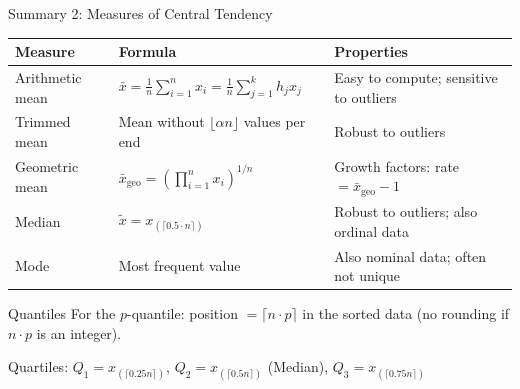 \documentclass[aspectratio=169,11pt]{beamer}
\begin{document}
\begin{frame}{Summary 2: Measures of Central Tendency}
  \begin{center}
    \small\renewcommand{\arraystretch}{1.2}
    \begin{tabular}{lll}
      \toprule
      \textbf{Measure} & \textbf{Formula} & \textbf{Properties} \\
      \midrule
      Arithmetic mean & $\bar{x} = \frac{1}{n}\sum_{i=1}^{n} x_i = \frac{1}{n}\sum_{j=1}^{k} h_j x_j$ & Easy to compute; sensitive to outliers \\[3pt]
      Trimmed mean & Mean without $\lfloor \alpha n \rfloor$ values per end & Robust to outliers \\[3pt]
      Geometric mean & $\bar{x}_{\text{geo}} = \left(\prod_{i=1}^{n} x_i\right)^{1/n}$ & Growth factors: rate $= \bar{x}_{\text{geo}} - 1$ \\[3pt]
      Median & $\tilde{x} = x_{(\lceil 0.5 \cdot n \rceil)}$ & Robust to outliers; also ordinal data \\[3pt]
      Mode & Most frequent value & Also nominal data; often not unique \\
      \bottomrule
    \end{tabular}
  \end{center}

  \begin{block}{Quantiles}
    For the $p$-quantile: position $= \lceil n \cdot p \rceil$ in the sorted data (no rounding if $n \cdot p$ is an integer).

    Quartiles: $Q_1 = x_{(\lceil 0.25n \rceil)}$, \quad $Q_2 = x_{(\lceil 0.5n \rceil)}$ (Median), \quad $Q_3 = x_{(\lceil 0.75n \rceil)}$
  \end{block}
\end{frame}
\end{document}

